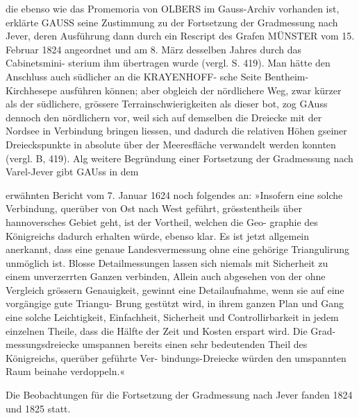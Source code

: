 \documentclass[12pt,a4paper]{article}
\theoremstyle{plain}
\theoremstyle{definition}
\theoremstyle{remark}
\begin{document}
die ebenso wie das Promemoria von OLBERS im Gauss-Archiv vorhanden ist, erklärte GAUSS seine Zustimmung
zu der Fortsetzung der Gradmessung nach Jever, deren Ausführung dann durch ein Rescript des Grafen
MÜNSTER vom 15. Februar 1824 angeordnet und am 8. März desselben Jahres durch das Cabinetsmini-
sterium ihm übertragen wurde (vergl. S. 419). Man hätte den Anschluss auch südlicher an die KRAYENHOFF-
sche Seite Bentheim-Kirchhesepe ausführen können; aber obgleich der nördlichere Weg, zwar kürzer als der
südlichere, grössere Terrainschwierigkeiten als dieser bot, zog GAuss dennoch den nördlichern vor, weil sich
auf demselben die Dreiecke mit der Nordsee in Verbindung bringen liessen, und dadurch die relativen
Höhen gseiner Dreieckspunkte in absolute über der Meeresfläche verwandelt werden konnten (vergl.
B, 419). Alg weitere Begründung einer Fortsetzung der Gradmessung nach Varel-Jever gibt GAUss in dem

\noindent

\noindent
erwähnten Bericht vom 7. Januar 1624 noch folgendes an: »Insofern eine solche Verbindung, querüber von
Ost nach West geführt, grösstentheils über hannoversches Gebiet geht, ist der Vortheil, welchen die Geo-
graphie des Königreichs dadurch erhalten würde, ebenso klar. Es ist jetzt allgemein anerkannt, dass eine
genaue Landesvermessung ohne eine gehörige Triangulirung unmöglich ist. Blosse Detailmessungen lassen
sich niemals mit Sicherheit zu einem unverzerrten Ganzen verbinden, Allein auch abgesehen von der ohne
Vergleich grössern Genauigkeit, gewinnt eine Detailaufnahme, wenn sie auf eine vorgängige gute Triangu-
Brung gestützt wird, in ihrem ganzen Plan und Gang eine solche Leichtigkeit, Einfachheit, Sicherheit und
Controllirbarkeit in jedem einzelnen Theile, dass die Hälfte der Zeit und Kosten erspart wird. Die Grad-
messungsdreiecke umspannen bereits einen sehr bedeutenden Theil des Königreichs, querüber geführte Ver-
bindungs-Dreiecke würden den umspannten Raum beinahe verdoppeln.«

\noindent
Die Beobachtungen für die Fortsetzung der Gradmessung nach Jever fanden 1824 und 1825 statt.
\end{document}
